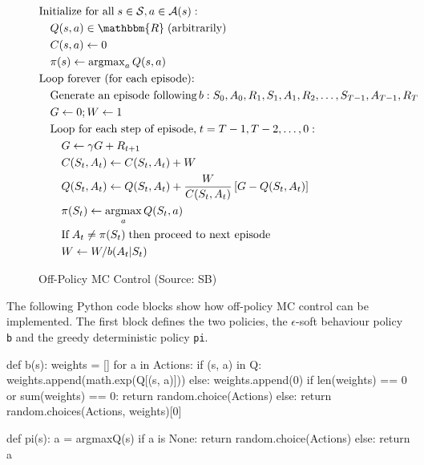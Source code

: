 \begin{figure}
\small
\begin{tcolorbox}[colback=code]
\vspace{-\baselineskip}
\begin{align*}
& \text{Initialize for all}\; s \in \mathcal{S}, a \in \mathcal{A}(s):\\
& \quad Q(s,a) \in \mathbbm{R}\; \text{(arbitrarily)} \\
& \quad C(s, a) \leftarrow 0 \\
& \quad \pi(s) \leftarrow \operatorname{arg max}_a Q(s, a) \\
& \text{Loop forever (for each episode):} \\
& \quad \text{Generate an episode following}\, b: S_0, A_0, R_1, S_1, A_1, R_2, \ldots, S_{T-1}, A_{T-1}, R_{T} \\
& \quad G \leftarrow 0; W \leftarrow 1 \\
& \quad \text{Loop for each step of episode,}\; t = T-1, T-2, \ldots, 0: \\
& \quad \quad G \leftarrow \gamma G + R_{t+1} \\
& \quad \quad C(S_t, A_t) \leftarrow C(S_t, A_t) + W \\
& \quad \quad Q(S_t, A_t) \leftarrow Q(S_t, A_t) + \frac{W}{C(S_t, A_t)} \left[ G - Q(S_t, A_t) \right] \\
& \quad \quad \pi(S_t) \leftarrow \operatorname*{arg max}_a Q(S_t, a) \\
& \quad \quad \text{If}\; A_t \neq \pi(S_t) \; \text{then proceed to next episode} \\
& \quad \quad W \leftarrow W / b(A_t | S_t)
\end{align*}
\end{tcolorbox}
\caption[Off-Policy MC Control]{Off-Policy MC Control (Source: SB)}
\label{fig:offpolicymc}
\end{figure}

The following Python code blocks show how off-policy MC control can be implemented. The first block defines the two policies, the $\epsilon$-soft behaviour policy \texttt{b} and the greedy deterministic policy \texttt{pi}.

\begin{samepage}
\begin{pythoncode}
def b(s):
    weights = []
    for a in Actions:
        if (s, a) in Q:
            weights.append(math.exp(Q[(s, a)]))
        else:
            weights.append(0)
    if len(weights) == 0 or sum(weights) == 0:
        return random.choice(Actions)
    else:
        return random.choices(Actions, weights)[0]

def pi(s):
    a = argmaxQ(s)
    if a is None:
        return random.choice(Actions)
    else:
        return a
\end{pythoncode}
\end{samepage}

